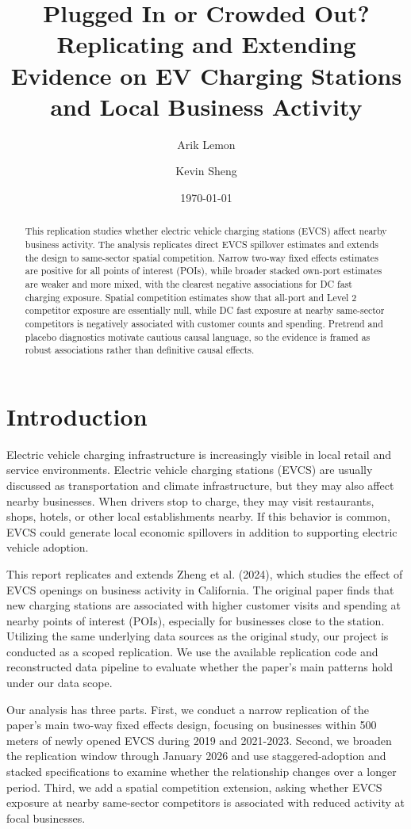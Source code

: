 \documentclass[12pt]{article}
\title{Plugged In or Crowded Out? Replicating and Extending Evidence on EV Charging Stations and Local Business Activity}
\author{Arik Lemon \and Kevin Sheng}
\date{\today}
\begin{document}
\maketitle

\begin{abstract}
This replication studies whether electric vehicle charging stations (EVCS) affect nearby business activity. The analysis replicates direct EVCS spillover estimates and extends the design to same-sector spatial competition. Narrow two-way fixed effects estimates are positive for all points of interest (POIs), while broader stacked own-port estimates are weaker and more mixed, with the clearest negative associations for DC fast charging exposure. Spatial competition estimates show that all-port and Level 2 competitor exposure are essentially null, while DC fast exposure at nearby same-sector competitors is negatively associated with customer counts and spending. Pretrend and placebo diagnostics motivate cautious causal language, so the evidence is framed as robust associations rather than definitive causal effects.
\end{abstract}

\section{Introduction}
Electric vehicle charging infrastructure is increasingly visible in local retail and service environments. Electric vehicle charging stations (EVCS) are usually discussed as transportation and climate infrastructure, but they may also affect nearby businesses. When drivers stop to charge, they may visit restaurants, shops, hotels, or other local establishments nearby. If this behavior is common, EVCS could generate local economic spillovers in addition to supporting electric vehicle adoption.

This report replicates and extends Zheng et al. (2024), which studies the effect of EVCS openings on business activity in California. The original paper finds that new charging stations are associated with higher customer visits and spending at nearby points of interest (POIs), especially for businesses close to the station. Utilizing the same underlying data sources as the original study, our project is conducted as a scoped replication. We use the available replication code and reconstructed data pipeline to evaluate whether the paper’s main patterns hold under our data scope.

Our analysis has three parts. First, we conduct a narrow replication of the paper’s main two-way fixed effects design, focusing on businesses within 500 meters of newly opened EVCS during 2019 and 2021-2023. Second, we broaden the replication window through January 2026 and use staggered-adoption and stacked specifications to examine whether the relationship changes over a longer period. Third, we add a spatial competition extension, asking whether EVCS exposure at nearby same-sector competitors is associated with reduced activity at focal businesses.
\end{document}
